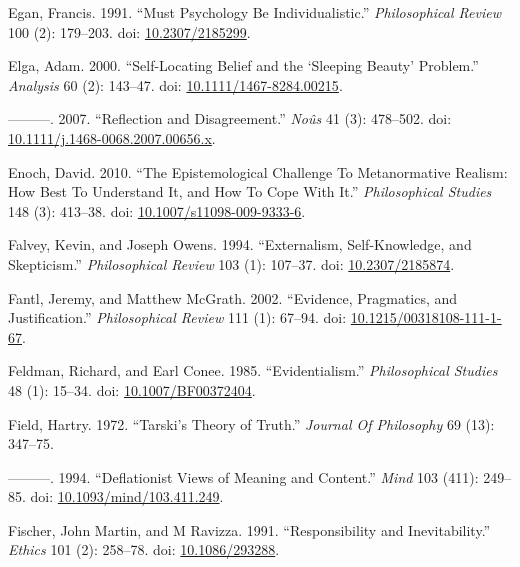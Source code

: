 \documentclass[
  10pt,
  letterpaper,
  DIV=11,
  numbers=noendperiod,
  twoside]{scrartcl}
\newlength{\cslhangindent}
\newenvironment{CSLReferences}[2] %
 {\begin{list}{}{%
  \setlength{\itemindent}{0pt}
  \setlength{\leftmargin}{0pt}
  \setlength{\parsep}{0pt}
  \ifodd #1
   \setlength{\leftmargin}{\cslhangindent}
   \setlength{\itemindent}{-1\cslhangindent}
  \fi
  \setlength{\itemsep}{#2\baselineskip}}}
 {\end{list}}
\begin{document}
\begin{CSLReferences}{1}{0}
Egan, Francis. 1991. {``Must Psychology Be Individualistic.''}
\emph{Philosophical Review} 100 (2): 179--203. doi:
\href{https://doi.org/10.2307/2185299}{10.2307/2185299}.

Elga, Adam. 2000. {``Self-Locating Belief and the {`Sleeping Beauty'}
Problem.''} \emph{Analysis} 60 (2): 143--47. doi:
\href{https://doi.org/10.1111/1467-8284.00215}{10.1111/1467-8284.00215}.

---------. 2007. {``Reflection and Disagreement.''} \emph{Noûs} 41 (3):
478--502. doi:
\href{https://doi.org/10.1111/j.1468-0068.2007.00656.x}{10.1111/j.1468-0068.2007.00656.x}.

Enoch, David. 2010. {``The Epistemological Challenge To Metanormative
Realism: How Best To Understand It, and How To Cope With It.''}
\emph{Philosophical Studies} 148 (3): 413--38. doi:
\href{https://doi.org/10.1007/s11098-009-9333-6}{10.1007/s11098-009-9333-6}.

Falvey, Kevin, and Joseph Owens. 1994. {``Externalism, Self-Knowledge,
and Skepticism.''} \emph{Philosophical Review} 103 (1): 107--37. doi:
\href{https://doi.org/10.2307/2185874}{10.2307/2185874}.

Fantl, Jeremy, and Matthew McGrath. 2002. {``Evidence, Pragmatics, and
Justification.''} \emph{Philosophical Review} 111 (1): 67--94. doi:
\href{https://doi.org/10.1215/00318108-111-1-67}{10.1215/00318108-111-1-67}.

Feldman, Richard, and Earl Conee. 1985. {``Evidentialism.''}
\emph{Philosophical Studies} 48 (1): 15--34. doi:
\href{https://doi.org/10.1007/BF00372404}{10.1007/BF00372404}.

Field, Hartry. 1972. {``Tarski's Theory of Truth.''} \emph{Journal Of
Philosophy} 69 (13): 347--75.

---------. 1994. {``Deflationist Views of Meaning and Content.''}
\emph{Mind} 103 (411): 249--85. doi:
\href{https://doi.org/10.1093/mind/103.411.249}{10.1093/mind/103.411.249}.

Fischer, John Martin, and M Ravizza. 1991. {``Responsibility and
Inevitability.''} \emph{Ethics} 101 (2): 258--78. doi:
\href{https://doi.org/10.1086/293288}{10.1086/293288}.


\end{CSLReferences}
\end{document}
